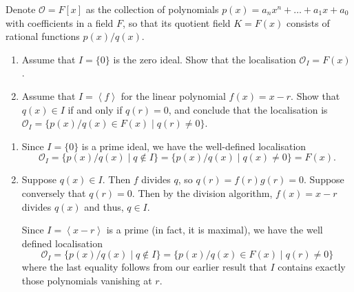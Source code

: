\documentclass[12 pt, letterpaper]{hmcpset}
\begin{document}
\pagebreak

\begin{problem}[Problem 4.]
	Denote $\mathcal{O} = F[x]$ as the collection of polynomials $p(x) = a_{n} x^{n} + \dots + a_{1} x + a_{0}$ with coefficients in a field $F$, so that its quotient field $K = F(x)$ consists of rational functions $p(x) / q(x)$.
	\begin{enumerate}
		\item Assume that $I = \{ 0 \}$ is the zero ideal. Show that the localisation $\mathcal{O}_{I} = F(x)$.
		\item Assume that $I = \left < f \right >$ for the linear polynomial $f(x) = x - r$. Show that $q(x) \in I$ if and only if $q(r) = 0$, and conclude that the localisation is $\mathcal{O}_{I} = \{ p(x) / q(x) \in F(x) \mid q(r) \neq 0 \}$.
	\end{enumerate}
\end{problem}

\begin{solution}
	\begin{enumerate}
		\item Since $I = \{ 0 \}$ is a prime ideal, we have the well-defined localisation
			\[
				\mathcal{O}_{I} = \{ p(x) / q(x) \mid q \notin I \} = \{ p(x) / q(x) \mid q(x) \neq 0 \} = F(x).
			\]
		\item Suppose $q(x) \in I$. Then $f$ divides $q$, so $q(r) = f(r) g(r) = 0$. Suppose conversely that $q(r) = 0$. Then by the division algorithm, $f(x) = x - r$  divides $q(x)$ and thus, $q \in I$.

			Since $I = \left < x - r \right >$ is a prime (in fact, it is maximal), we have the well defined localisation
			\[
				\mathcal{O}_{I} = \{ p(x) / q(x) \mid q \notin I \} = \{ p(x) / q(x) \in F(x) \mid q(r) \neq 0 \}
			\]
			where the last equality follows from our earlier result that $I$ contains exactly those polynomials vanishing at $r$.
	\end{enumerate}
\end{solution}

\pagebreak
\end{document}
